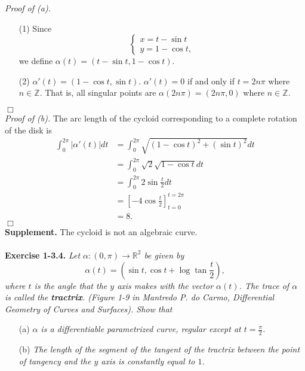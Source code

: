 \documentclass{article}
\begin{document}
\emph{Proof of (a).}
\begin{enumerate}
\item[(1)]
Since
\begin{equation*}
  \begin{cases}
     x = t - \sin t \\
     y = 1 - \cos t,
  \end{cases}
\end{equation*}
we define $\alpha(t) = (t - \sin t, 1 - \cos t)$.
\item[(2)]
$\alpha'(t) = (1 - \cos t, \sin t)$.
$\alpha'(t) = 0$ if and only if $t = 2n\pi$ where $n \in \mathbb{Z}$.
That is, all singular points are $\alpha(2n\pi) = (2n\pi, 0)$ where $n \in \mathbb{Z}$.
\end{enumerate}
$\Box$ \\

\emph{Proof of (b).}
The arc length of the cycloid corresponding to a complete rotation of the disk is
\begin{align*}
\int_{0}^{2\pi} |\alpha'(t)| dt
&= \int_{0}^{2\pi} \sqrt{(1-\cos t)^2 + (\sin t)^2} dt \\
&= \int_{0}^{2\pi} \sqrt{2} \sqrt{1 - \cos t} dt \\
&= \int_{0}^{2\pi} 2 \sin \frac{t}{2} dt \\
&= \left[ -4 \cos\frac{t}{2} \right]_{t=0}^{t=2\pi} \\
&= 8.
\end{align*}
$\Box$ \\

\textbf{Supplement.}
The cycloid is not an algebraic curve. \\\\






\textbf{Exercise 1-3.4.}
\emph{Let $\alpha: (0, \pi) \to \mathbb{R}^2$ be given by
$$\alpha(t) = (\sin t, \cos t + \log\tan\frac{t}{2}),$$
where $t$ is the angle that the $y$ axis makes with the vector $\alpha(t)$.
The trace of $\alpha$ is called the \textbf{tractrix}.
(Figure 1-9 in Mantredo P. do Carmo, Differential Geometry of Curves and Surfaces).
Show that}
\begin{enumerate}
  \item[(a)]
  \emph{$\alpha$ is a differentiable parametrized curve,
  regular except at $t = \frac{\pi}{2}$.}
  \item[(b)]
  \emph{The length of the segment of the tangent of the tractrix between
  the point of tangency and the $y$ axis is constantly equal to $1$.} \\
\end{enumerate}
\end{document}
